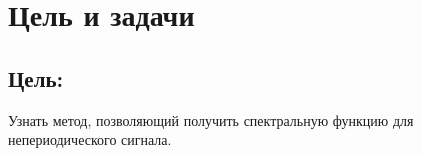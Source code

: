 \chapter*{Цель и задачи}
\label{ch:intro}

\section*{\textbf{Цель:}}

Узнать метод, позволяющий получить спектральную функцию для непериодического сигнала.

\endinput